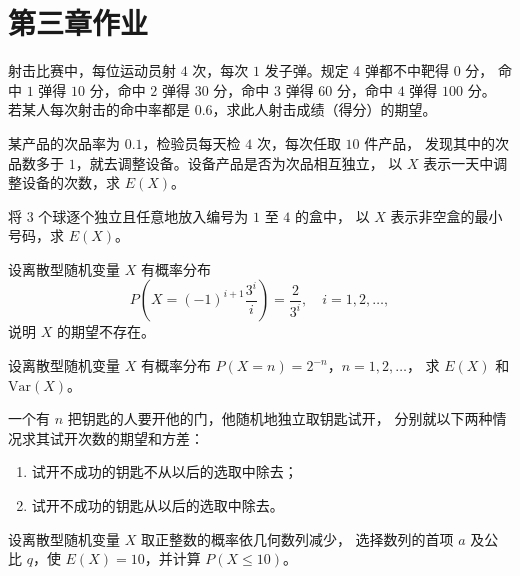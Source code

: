 \newpage
\section{第三章作业}

\begin{homework}[3.1]
射击比赛中，每位运动员射 $4$ 次，每次 $1$ 发子弹。规定 4 弹都不中靶得 $0$ 分，
命中 $1$ 弹得 $10$ 分，命中 $2$ 弹得 $30$ 分，命中 $3$ 弹得 $60$ 分，命中 $4$ 弹得 $100$ 分。
若某人每次射击的命中率都是 $0.6$，求此人射击成绩（得分）的期望。
\end{homework}

\begin{homework}[3.2]
某产品的次品率为 $0.1$，检验员每天检 $4$ 次，每次任取 $10$ 件产品，
发现其中的次品数多于 $1$，就去调整设备。设备产品是否为次品相互独立，
以 $X$ 表示一天中调整设备的次数，求 $E(X)$。
\end{homework}

\begin{homework}[3.3]
将 $3$ 个球逐个独立且任意地放入编号为 $1$ 至 $4$ 的盒中，
以 $X$ 表示非空盒的最小号码，求 $E(X)$。
\end{homework}

\begin{homework}[3.4]
设离散型随机变量 $X$ 有概率分布
\[
P\!\left(X=(-1)^{i+1}\frac{3^i}{i}\right)=\frac{2}{3^i},\quad i=1,2,\ldots,
\]
说明 $X$ 的期望不存在。
\end{homework}

\begin{homework}[3.5]
设离散型随机变量 $X$ 有概率分布 $P(X=n)=2^{-n}$，$n=1,2,\ldots$，
求 $E(X)$ 和 $\mathrm{Var}(X)$。
\end{homework}

\begin{homework}[3.6]
一个有 $n$ 把钥匙的人要开他的门，他随机地独立取钥匙试开，
分别就以下两种情况求其试开次数的期望和方差：

\begin{enumerate}[(1)]
  \item 试开不成功的钥匙不从以后的选取中除去；
  \item 试开不成功的钥匙从以后的选取中除去。
\end{enumerate}
\end{homework}

\begin{homework}[3.7]
设离散型随机变量 $X$ 取正整数的概率依几何数列减少，
选择数列的首项 $a$ 及公比 $q$，使 $E(X)=10$，并计算 $P(X\le 10)$。
\end{homework}

